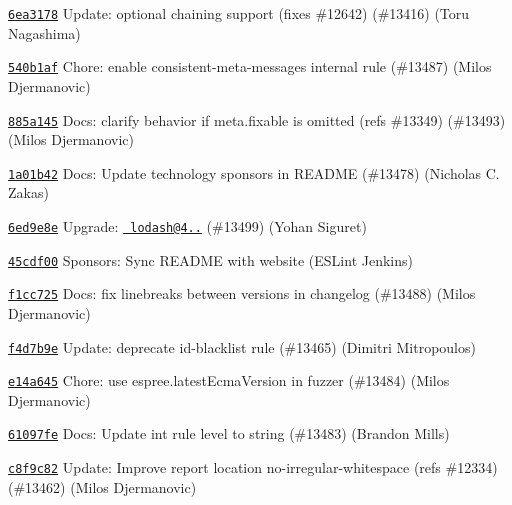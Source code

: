 \begin{DoxyItemize}
\item \href{https://github.com/eslint/eslint/commit/6ea3178776eae0e40c3f5498893e8aab0e23686b}{\texttt{ {\ttfamily 6ea3178}}} Update\+: optional chaining support (fixes \#12642) (\#13416) (Toru Nagashima)
\item \href{https://github.com/eslint/eslint/commit/540b1af77278ae649b621aa8d4bf8d6de03c3155}{\texttt{ {\ttfamily 540b1af}}} Chore\+: enable consistent-\/meta-\/messages internal rule (\#13487) (Milos Djermanovic)
\item \href{https://github.com/eslint/eslint/commit/885a1455691265db88dc0befe9b48a69d69e8b9c}{\texttt{ {\ttfamily 885a145}}} Docs\+: clarify behavior if {\ttfamily meta.\+fixable} is omitted (refs \#13349) (\#13493) (Milos Djermanovic)
\item \href{https://github.com/eslint/eslint/commit/1a01b420eaab0de03dab5cc190a9f2a860c21a84}{\texttt{ {\ttfamily 1a01b42}}} Docs\+: Update technology sponsors in README (\#13478) (Nicholas C. Zakas)
\item \href{https://github.com/eslint/eslint/commit/6ed9e8e4ff038c0259b0e7fe7ab7f4fd4ec55801}{\texttt{ {\ttfamily 6ed9e8e}}} Upgrade\+: \href{mailto:lodash@4.17.19}{\texttt{ lodash@4..}} (\#13499) (Yohan Siguret)
\item \href{https://github.com/eslint/eslint/commit/45cdf00da6aeff3d584d37b0710fc8d6ad9456d6}{\texttt{ {\ttfamily 45cdf00}}} Sponsors\+: Sync README with website (ESLint Jenkins)
\item \href{https://github.com/eslint/eslint/commit/f1cc725ba1b8646dcf06a83716d96ad9bb726172}{\texttt{ {\ttfamily f1cc725}}} Docs\+: fix linebreaks between versions in changelog (\#13488) (Milos Djermanovic)
\item \href{https://github.com/eslint/eslint/commit/f4d7b9e1a599346b2f21ff9de003b311b51411e6}{\texttt{ {\ttfamily f4d7b9e}}} Update\+: deprecate id-\/blacklist rule (\#13465) (Dimitri Mitropoulos)
\item \href{https://github.com/eslint/eslint/commit/e14a645aa495558081490f990ba221e21aa6b27c}{\texttt{ {\ttfamily e14a645}}} Chore\+: use espree.\+latest\+Ecma\+Version in fuzzer (\#13484) (Milos Djermanovic)
\item \href{https://github.com/eslint/eslint/commit/61097fe5cc275d414a0c8e19b31c6060cb5568b7}{\texttt{ {\ttfamily 61097fe}}} Docs\+: Update int rule level to string (\#13483) (Brandon Mills)
\item \href{https://github.com/eslint/eslint/commit/c8f9c8210cf4b9da8f07922093d7b219abad9f10}{\texttt{ {\ttfamily c8f9c82}}} Update\+: Improve report location no-\/irregular-\/whitespace (refs \#12334) (\#13462) (Milos Djermanovic)

\end{DoxyItemize}
